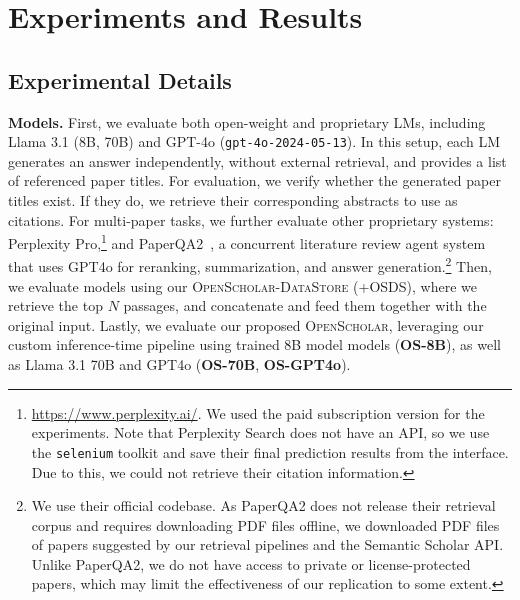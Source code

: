 \documentclass{article} %
\newcommand{\model}{\textsc{OpenScholar}\xspace}
\renewcommand{\paragraph}[1]{\noindent \textbf{#1}}
\begin{document}



\section{Experiments and Results}

\label{sec:results}

\subsection{Experimental Details}
\paragraph{Models.}
First, we evaluate both open-weight and proprietary LMs, including Llama 3.1 (8B, 70B) and GPT-4o (\texttt{gpt-4o-2024-05-13}). In this setup, each LM generates an answer independently, without external retrieval, and provides a list of referenced paper titles. For evaluation, we verify whether the generated paper titles exist. If they do, we retrieve their corresponding abstracts to use as citations. 
For multi-paper tasks, we further evaluate other proprietary systems: Perplexity Pro,\footnote{\url{https://www.perplexity.ai/}. We used the paid subscription version for the experiments. Note that Perplexity Search does not have an API, so we use the \texttt{selenium} toolkit and save their final prediction results from the interface. Due to this, we could not retrieve their citation information.} and PaperQA2~\citep{skarlinski2024language}, a concurrent literature review agent system that uses GPT4o for reranking, summarization, and answer generation.\footnote{We use their official codebase. As PaperQA2 does not release their retrieval corpus and requires downloading PDF files offline, we downloaded PDF files of papers suggested by our retrieval pipelines and the Semantic Scholar API. Unlike PaperQA2, we do not have access to private or license-protected papers, which may limit the effectiveness of our replication to some extent.}  
Then, we evaluate models using our \textsc{OpenScholar-DataStore} (+OSDS), where we retrieve the top $N$ passages, and concatenate and feed them together with the original input.  
Lastly, we evaluate our proposed \model, leveraging our custom inference-time pipeline using trained 8B model models ({\bf OS-8B}), as well as Llama 3.1 70B and GPT4o ({\bf OS-70B}, {\bf OS-GPT4o}).  
\end{document}
